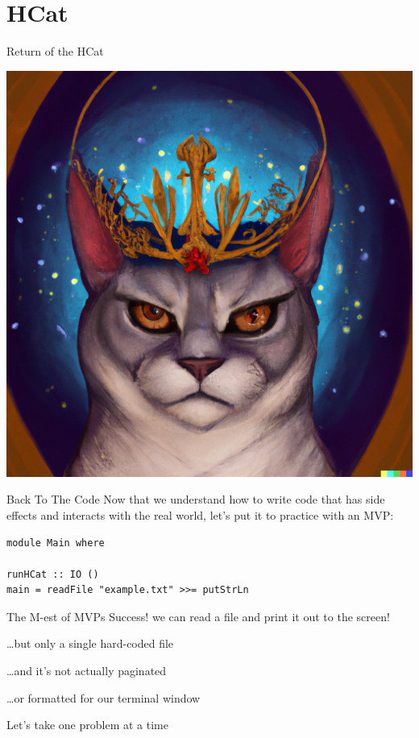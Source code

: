 \documentclass[10pt, presentation, colorlinks]{beamer}
\begin{document}
\section{HCat}
\label{sec:orgeaf6701}

\begin{frame}[label={sec:org0f2fd53}]{Return of the HCat}
\begin{center}
\includegraphics[height=0.6\textheight]{./img/return-of-the-hcat.png}
\end{center}
\end{frame}

\begin{frame}[label={sec:org8d4d718},fragile]{Back To The Code}
 Now that we understand how to write code that has side effects and
interacts with the real world, let's put it to practice with an \alert{MVP}:

\bigskip
\pause

\begin{verbatim}
module Main where

runHCat :: IO ()
main = readFile "example.txt" >>= putStrLn
\end{verbatim}
\end{frame}

\begin{frame}[label={sec:org6cfde5c}]{The M-est of MVPs}
\alert{Success!} we can read a file and print it out to the screen!

\bigskip
\pause
\ldots{}but only a single hard-coded file

\bigskip
\pause
\ldots{}and it's not actually paginated

\bigskip
\pause
\ldots{}or formatted for our terminal window

\bigskip
\pause
Let's take one problem at a time
\end{frame}
\end{document}
